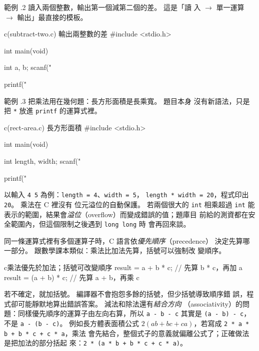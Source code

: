 範例 \thechapter.2 讀入兩個整數，輸出第一個減第二個的差。 這是「讀
入 $\to$ 單一運算 $\to$ 輸出」最直接的模板。

\begin{example}{c}{(subtract-two.c) 輸出兩整數的差}
#include <stdio.h>

int main(void) {
    int a, b;
    scanf("%

    printf("%
}
\end{example}


範例 \thechapter.3 把乘法用在幾何題：長方形面積是長乘寬。 題目本身
沒有新語法，只是把 \texttt{*} 放進 \texttt{printf} 的運算式裡。

\begin{example}{c}{(rect-area.c) 長方形面積}
#include <stdio.h>

int main(void) {
    int length, width;
    scanf("%

    printf("%
}
\end{example}


以輸入 \texttt{4 5} 為例：\texttt{length = 4}、\texttt{width = 5}，
\texttt{length * width = 20}，程式印出 \texttt{20}。 乘法在 C 裡沒有
位元溢位的自動保護。 若兩個很大的 \texttt{int} 相乘超過 \texttt{int}
能表示的範圍，結果會\emph{溢位}（overflow）而變成錯誤的值；題庫目
前給的測資都在安全範圍內，但這個限制之後遇到 \texttt{long long} 時
會再回來談。

同一條運算式裡有多個運算子時，C 語言依\emph{優先順序}（precedence）
決定先算哪一部分。 跟數學課本類似：乘法比加法先算，括號可以強制改
變順序。

\begin{code}{c}{乘法優先於加法；括號可改變順序}
result = a + b * c;      // 先算 b * c，再加 a
result = (a + b) * c;    // 先算 a + b，再乘 c
\end{code}

若不確定，就加括號。 編譯器不會抱怨多餘的括號，但少括號導致順序錯
誤，程式卻可能靜默地算出錯誤答案。 減法和除法還有\emph{結合方向}
（associativity）的問題：同樣優先順序的運算子由左向右算，所以
\texttt{a - b - c} 其實是 \texttt{(a - b) - c}，不是
\texttt{a - (b - c)}。 例如長方體表面積公式
$2(ab + bc + ca)$，若寫成 \texttt{2 * a * b + b * c + c * a}，乘法
會先結合，整個式子的意義就偏離公式了；正確做法是把加法的部分括起
來：\texttt{2 * (a * b + b * c + c * a)}。

